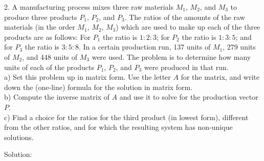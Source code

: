 \documentclass{article}
\begin{document}
2. A manufacturing process mixes three raw materials $M_1$, $M_2$, and $M_3$ to 
produce three products $P_1$, $P_2$, and $P_3$. The ratios of the amounts of the 
raw materials (in the order $M_1$, $M_2$, $M_3$) which are used to make up each 
of the three products are as follows: For $P_1$ the ratio is $1:2:3$; for $P_2$ 
the ratio is $1:3:5$; and for $P_3$ the ratio is $3:5:8$. In a certain 
production run, 137 units of $M_1$, 279 units of $M_2$, and 448 units of $M_3$ 
were used. The problem is to determine how many units of each of the products 
$P_1$, $P_2$, and $P_3$ were produced in that run. \\
a) Set this problem up in matrix form. Use the letter $A$ for the matrix, and 
write down the (one-line) formula for the solution in matrix form. \\
b) Compute the inverse matrix of $A$ and use it to solve for the production 
vector $P$. \\
c) Find a choice for the ratios for the third product (in lowest form), 
different from the other ratios, and for which the resulting system has 
non-unique solutions.

Solution:
\end{document}

